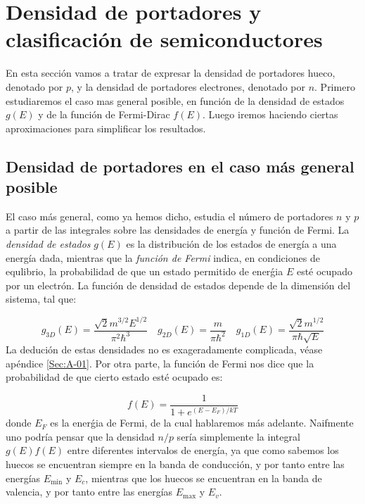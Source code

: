 
\section{Densidad de portadores y clasificación de semiconductores}

En esta sección vamos a tratar de expresar la densidad de portadores hueco, denotado por $p$, y la densidad de portadores electrones, denotado por $n$. Primero estudiaremos el caso mas general posible, en función de la densidad de estados $g(E)$ y de la función de Fermi-Dirac $f(E)$. Luego iremos haciendo ciertas aproximaciones para simplificar los resultados.

\subsection{Densidad de portadores en el caso más general posible}

El caso más general, como ya hemos dicho, estudia el número de portadores $n$ y $p$ a partir de las integrales sobre las densidades de energía y función de Fermi. La \textit{densidad de estados} $g(E)$ es la distribución de los estados de energía a una energía dada, mientras que la \textit{función de Fermi} indica, en condiciones de equlibrio, la probabilidad de que un estado permitido de enerǵia $E$ esté ocupado por un electrón. La función de densidad de estados depende de la dimensión del sistema, tal que:

\begin{equation}
	g_{3D} (E) = \frac{\sqrt{2}m^{3/2}E^{1/2}}{\pi^2 \hbar^3} \quad g_{2D} (E) = \frac{m}{\pi \hbar^2} \quad g_{1D} (E) = \frac{\sqrt{2}m^{1/2}}{\pi \hbar \sqrt{E}}
\end{equation}
La dedución de estas densidades no es exageradamente complicada, véase apéndice \ref{Sec:A-01}. Por otra parte, la función de Fermi nos dice que la probabilidad de que cierto estado esté ocupado es:


\begin{equation}
	f(E) = \frac{1}{1+e^{(E-E_F)/kT}}
\end{equation}
donde $E_F$ es la enerǵia de Fermi, de la cual hablaremos más adelante. Naifmente uno podría pensar que la densidad $n/p$ sería simplemente la integral $g(E)f(E)$ entre diferentes intervalos de energía, ya que como sabemos los huecos se encuentran siempre en la banda de conducción, y por tanto entre las energías $E_{\min}$ y $E_c$, mientras que los huecos se encuentran en la banda de valencia, y por tanto entre las energías $E_{\max}$ y $E_v$.

